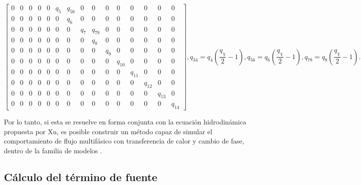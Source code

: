 \begin{subequations}
\begin{equation}
\begin{bmatrix}
		0 & 0 & 0 & 0 & 0 & q_5 & q_{56} & 0 & 0 & 0 & 0 & 0 & 0 & 0 & 0 \\
		0 & 0 & 0 & 0 & 0 & 0 & q_6 & 0 & 0 & 0 & 0 & 0 & 0 & 0 & 0 \\
		0 & 0 & 0 & 0 & 0 & 0 & 0 & q_7 & q_{78} & 0 & 0 & 0 & 0 & 0 & 0 \\
		0 & 0 & 0 & 0 & 0 & 0 & 0 & 0 & q_8 & 0 & 0 & 0 & 0 & 0 & 0 \\
		0 & 0 & 0 & 0 & 0 & 0 & 0 & 0 & 0 & q_{9} & 0 & 0 & 0 & 0 & 0 \\
		0 & 0 & 0 & 0 & 0 & 0 & 0 & 0 & 0 & 0 & q_{10} & 0 & 0 & 0 & 0 \\
		0 & 0 & 0 & 0 & 0 & 0 & 0 & 0 & 0 & 0 & 0 & q_{11} & 0 & 0 & 0 \\
		0 & 0 & 0 & 0 & 0 & 0 & 0 & 0 & 0 & 0 & 0 & 0 & q_{12} & 0 & 0 \\
		0 & 0 & 0 & 0 & 0 & 0 & 0 & 0 & 0 & 0 & 0 & 0 & 0 & q_{13} & 0 \\
		0 & 0 & 0 & 0 & 0 & 0 & 0 & 0 & 0 & 0 & 0 & 0 & 0 & 0 & q_{14}
		\end{bmatrix},	
	\end{equation}
	\begin{equation}
		q_{34} = q_4 \left( \dfrac{q_{\chi}}{2} - 1 \right),
	\end{equation}
	\begin{equation}
		q_{56} = q_6 \left( \dfrac{q_{\chi}}{2} - 1 \right),
	\end{equation}
	\begin{equation}
		q_{78} = q_8 \left( \dfrac{q_{\chi}}{2} - 1 \right).
	\end{equation}	
	\label{eq:modelo_3d_full}
\end{subequations}

Por lo tanto, si esta \lbe{} se resuelve en forma conjunta con la ecuaci\'on hidrodin\'amica propuesta por Xu, es posible construir un m\'etodo capaz de simular el comportamiento de flujo multif\'asico con transferencia de calor y cambio de fase, dentro de la familia de modelos \pp{}.



\subsection{C\'alculo del t\'ermino de fuente}

